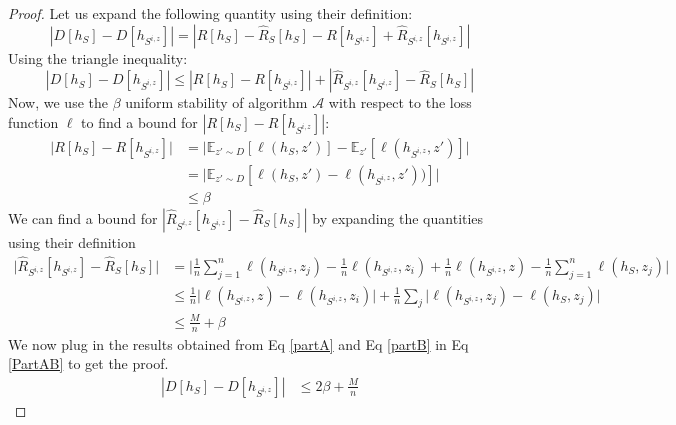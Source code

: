 \documentclass{article}
\begin{document}
\begin{proof}
Let us expand the following quantity using their definition: 
\begin{equation}\label{def_risk}
|D[h_S] - D[h_{S^{i,z}}]| = |R[h_S] - \hat{R}_S[h_S] - R[h_{S^{i,z}}] + \hat{R}_{S^{i,z}}[h_{S^{i,z}}]|
\end{equation}
Using the triangle inequality:
\begin{equation}
|D[h_S] - D[h_{S^{i,z}}]| \leq |R[h_S] - R[h_{S^{i,z}}]| + |\hat{R}_{S^{i,z}}[h_{S^{i,z}}] - \hat{R}_S[h_S]| \label{PartAB}
\end{equation}
Now, we use the $\beta$ uniform stability of algorithm $\mathcal{A}$ with respect to the loss function $\ell$ to find a bound for $|R[h_S] - R[h_{S^{i,z}}]|$:
\begin{equation}
\begin{split}
\bigl|R[h_S] - R[h_{S^{i,z}}]\bigr| &= \bigl| \mathbb{E}_{z' \sim D} [\ell(h_S, z')] - \mathbb{E}_{z'} [\ell(h_{S^{i,z}}, z')] \bigr| \\ 
&= \bigl|\mathbb{E}_{z' \sim D} [\ell(h_S, z') - \ell(h_{S^{i,z}}, z'))]\bigr| \\
& \leq \beta \label{partA}
\end{split}
\end{equation}
We can find a bound for $|\hat{R}_{S^{i,z}}[h_{S^{i,z}}] - \hat{R}_S[h_S]|$ by expanding the quantities using their definition
\begin{equation}
\begin{split}
\bigl|\hat{R}_{S^{i,z}}[h_{S^{i,z}}] - \hat{R}_S[h_S]\bigr| &= \biggr|\frac{1}{n}\sum_{j=1}^{n}\ell(h_{S^{i,z}}, z_j) - \frac{1}{n}\ell(h_{S^{i,z}}, z_i) + \frac{1}{n}\ell(h_{S^{i,z}}, z) - \frac{1}{n}\sum_{j=1}^{n}\ell(h_S, z_j)\biggl|\\
&\leq \frac{1}{n} \biggl|\ell(h_{S^{i,z}}, z) - \ell(h_{S^{i,z}}, z_i)\biggr| + \frac{1}{n}\sum_j\biggl|\ell(h_{S^{i,z}}, z_j) -  \ell(h_S, z_j)\biggr| \\
&\leq \frac{M}{n} + \beta \label{partB}
\end{split}
\end{equation}
We now plug in the results obtained from Eq \ref{partA} and Eq \ref{partB} in Eq \ref{PartAB} to get the proof.
\begin{equation}\label{proof1}
\begin{split}
|D[h_S] - D[h_{S^{i,z}}]| & \leq 2\beta + \frac{M}{n}
\end{split}
\end{equation}
\end{proof}
\end{document}
